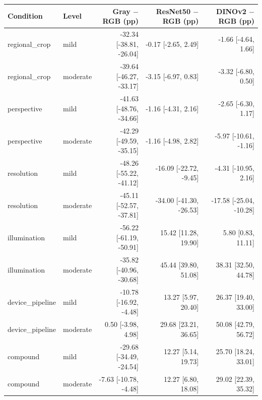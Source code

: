 \begin{tabular}{llrrr}
\toprule
Condition & Level & \makecell{Gray $-$ RGB\\(pp)} & \makecell{ResNet50 $-$ RGB\\(pp)} & \makecell{DINOv2 $-$ RGB\\(pp)} \\
\midrule
regional\_crop & mild & -32.34 [-38.81, -26.04] & -0.17 [-2.65, 2.49] & -1.66 [-4.64, 1.66] \\
regional\_crop & moderate & -39.64 [-46.27, -33.17] & -3.15 [-6.97, 0.83] & -3.32 [-6.80, 0.50] \\
perspective & mild & -41.63 [-48.76, -34.66] & -1.16 [-4.31, 2.16] & -2.65 [-6.30, 1.17] \\
perspective & moderate & -42.29 [-49.59, -35.15] & -1.16 [-4.98, 2.82] & -5.97 [-10.61, -1.16] \\
resolution & mild & -48.26 [-55.22, -41.12] & -16.09 [-22.72, -9.45] & -4.31 [-10.95, 2.16] \\
resolution & moderate & -45.11 [-52.57, -37.81] & -34.00 [-41.30, -26.53] & -17.58 [-25.04, -10.28] \\
illumination & mild & -56.22 [-61.19, -50.91] & 15.42 [11.28, 19.90] & 5.80 [0.83, 11.11] \\
illumination & moderate & -35.82 [-40.96, -30.68] & 45.44 [39.80, 51.08] & 38.31 [32.50, 44.78] \\
device\_pipeline & mild & -10.78 [-16.92, -4.48] & 13.27 [5.97, 20.40] & 26.37 [19.40, 33.00] \\
device\_pipeline & moderate & 0.50 [-3.98, 4.98] & 29.68 [23.21, 36.65] & 50.08 [42.79, 56.72] \\
compound & mild & -29.68 [-34.49, -24.54] & 12.27 [5.14, 19.73] & 25.70 [18.24, 33.01] \\
compound & moderate & -7.63 [-10.78, -4.48] & 12.27 [6.80, 18.08] & 29.02 [22.39, 35.32] \\
\bottomrule
\end{tabular}
